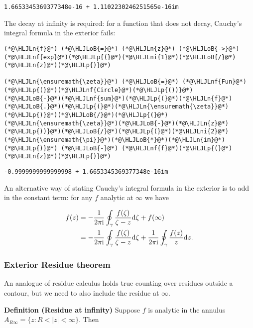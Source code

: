 \documentclass[12pt,a4paper]{article}
\newcommand{\HLJLn}[1]{#1}
\newcommand{\HLJLnf}[1]{\textcolor[RGB]{66,102,213}{#1}}
\newcommand{\HLJLni}[1]{\textcolor[RGB]{59,151,46}{#1}}
\newcommand{\HLJLoB}[1]{\textcolor[RGB]{102,102,102}{\textbf{#1}}}
\newcommand{\HLJLp}[1]{#1}
\def\D{ {\rm d} }
\def\I{ {\rm i} }
\begin{document}
\begin{lstlisting}
1.6653345369377348e-16 + 1.1102230246251565e-16im
\end{lstlisting}


The decay at infinity is required: for a function that does not decay, Cauchy's integral formula in the exterior fails:


\begin{lstlisting}
(*@\HLJLn{f}@*) (*@\HLJLoB{=}@*) (*@\HLJLn{z}@*) (*@\HLJLoB{->}@*) (*@\HLJLnf{exp}@*)(*@\HLJLp{(}@*)(*@\HLJLni{1}@*)(*@\HLJLoB{/}@*)(*@\HLJLn{z}@*)(*@\HLJLp{)}@*)

(*@\HLJLn{\ensuremath{\zeta}}@*) (*@\HLJLoB{=}@*) (*@\HLJLnf{Fun}@*)(*@\HLJLp{(}@*)(*@\HLJLnf{Circle}@*)(*@\HLJLp{())}@*)
(*@\HLJLoB{-}@*)(*@\HLJLnf{sum}@*)(*@\HLJLp{(}@*)(*@\HLJLn{f}@*)(*@\HLJLoB{.}@*)(*@\HLJLp{(}@*)(*@\HLJLn{\ensuremath{\zeta}}@*)(*@\HLJLp{)}@*)(*@\HLJLoB{/}@*)(*@\HLJLp{(}@*)(*@\HLJLn{\ensuremath{\zeta}}@*)(*@\HLJLoB{-}@*)(*@\HLJLn{z}@*)(*@\HLJLp{))}@*)(*@\HLJLoB{/}@*)(*@\HLJLp{(}@*)(*@\HLJLni{2}@*)(*@\HLJLn{\ensuremath{\pi}}@*)(*@\HLJLoB{*}@*)(*@\HLJLn{im}@*)(*@\HLJLp{)}@*) (*@\HLJLoB{-}@*) (*@\HLJLnf{f}@*)(*@\HLJLp{(}@*)(*@\HLJLn{z}@*)(*@\HLJLp{)}@*)
\end{lstlisting}

\begin{lstlisting}
-0.9999999999999998 + 1.6653345369377348e-16im
\end{lstlisting}


An alternative way of stating Cauchy's integral formula in the exterior is to add in the constant term: for any $f$ analytic at $\infty$ we have


\begin{align*}
f(z) &= -{1 \over 2 \pi \I} \oint_\gamma {f(\zeta) \over \zeta - z} \D \zeta  + f(\infty)  \\
    &= -{1 \over 2 \pi \I} \oint_\gamma {f(\zeta) \over \zeta - z} \D \zeta  + {1 \over 2 \pi \I} \oint_\gamma {f(z) \over z} \D z.
\end{align*}
\subsubsection{Exterior Residue theorem}
An analogue of residue calculus holds true counting over residues outside a contour, but we need to also include the residue at $\infty$.

\textbf{Definition (Residue at infinity)}  Suppose $f$ is analytic in the annulus $A_{R\infty} = \{z : R < |z| < \infty \}$. Then
\end{document}
